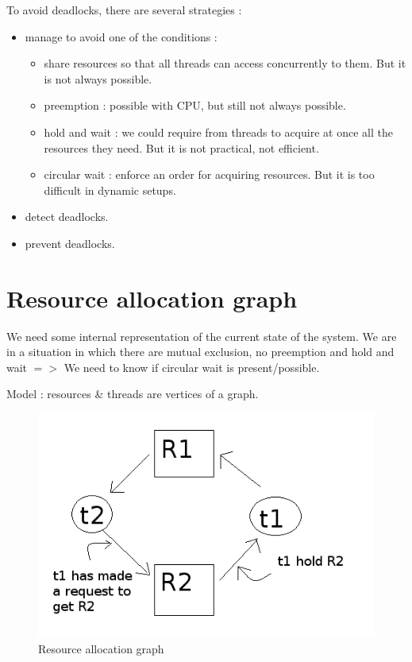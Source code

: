 \documentclass[a4paper,10pt]{article}
\begin{document}
To avoid deadlocks, there are several strategies :
\begin{itemize}
  \item manage to avoid one of the conditions :
  \begin{itemize}
    \item share resources so that all threads can access concurrently to them. But it is not always possible.
    \item preemption : possible with CPU, but still not always possible.
    \item hold and wait : we could require from threads to acquire at once all the resources they need. But it is not practical, not efficient.
    \item circular wait : enforce an order for acquiring resources. But it is too difficult in dynamic setups.
  \end{itemize}
  \item detect deadlocks.
  \item prevent deadlocks.
\end{itemize}

\section{Resource allocation graph}

We need some internal representation of the current state of the system. We are in a situation in which there are mutual exclusion, no preemption and hold and wait $=>$  We need to know if circular wait is present/possible.

Model : resources \& threads are vertices of a graph.
\begin{figure}[h]
  \begin{center}
    \includegraphics[scale =0.6]{resource_allocation_graph.png}
    \caption{Resource allocation graph}
    \label{}
  \end{center}
\end{figure}
\end{document}
